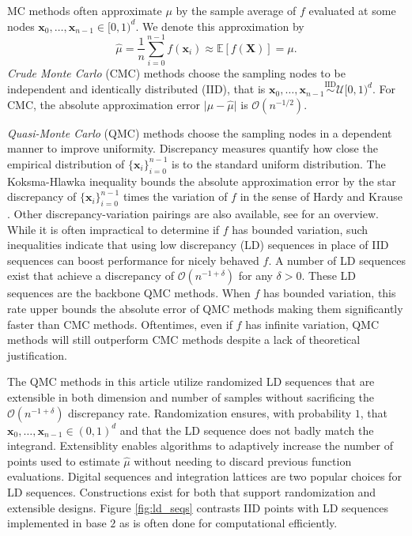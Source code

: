 \documentclass[graybox]{svmult}
\begin{document}
MC methods often approximate $\mu$ by the sample average of $f$ evaluated at some nodes $\boldsymbol{x}_0,\dots,\boldsymbol{x}_{n-1} \in [0,1)^d$. We denote this approximation by  
\begin{equation}
    \label{eq:mcapprox}
    \hat{\mu} = \frac{1}{n}\sum_{i=0}^{n-1} f(\boldsymbol{x}_i) \approx \mathbb{E}[f(\boldsymbol{X})] = \mu. 
\end{equation}
\emph{Crude Monte Carlo} (CMC) methods choose the sampling nodes to be independent and identically distributed (IID), that is $\boldsymbol{x}_0,\dots,\boldsymbol{x}_{n-1} \overset{\text{IID}}{\sim} \mathcal{U}[0,1)^{d}$. For CMC, the absolute approximation error $\lvert \mu - \hat{\mu} \rvert$ is $\mathcal{O}(n^{-1/2})$. 

\emph{Quasi-Monte Carlo} (QMC) methods choose the sampling nodes in a dependent manner to improve uniformity. Discrepancy measures quantify how close the empirical distribution of $\{\boldsymbol{x}_i\}_{i=0}^{n-1}$ is to the standard uniform distribution. The Koksma-Hlawka inequality bounds the absolute approximation error by the star discrepancy of $\{\boldsymbol{x}_i\}_{i=0}^{n-1}$ times the variation of $f$ in the sense of Hardy and Krause \cite{dick2013high}. Other discrepancy-variation pairings are also available, see \cite{hickernell1998generalized} for an overview. While it is often impractical to determine if $f$ has bounded variation, such inequalities indicate that using low discrepancy (LD) sequences in place of IID sequences can boost performance for nicely behaved $f$. A number of LD sequences exist that achieve a discrepancy of $\mathcal{O}(n^{-1+\delta})$ for any $\delta > 0$. These LD sequences are the backbone QMC methods. When $f$ has bounded variation, this rate upper bounds the absolute error of QMC methods making them significantly faster than CMC methods. Oftentimes, even if $f$ has infinite variation, QMC methods will still outperform CMC methods despite a lack of theoretical justification. 


The QMC methods in this article utilize randomized LD sequences that are extensible in both dimension and number of samples without sacrificing the $\mathcal{O}(n^{-1+\delta})$ discrepancy rate. Randomization ensures, with probability $1$, that $\boldsymbol{x}_0,\dots,\boldsymbol{x}_{n-1} \in (0,1)^d$ and that the LD sequence does not badly match the integrand. Extensiblity enables algorithms to adaptively increase the number of points used to estimate $\hat{\mu}$ without needing to discard previous function evaluations. Digital sequences and integration lattices are two popular choices for LD sequences. Constructions exist for both that support randomization and extensible designs. Figure \ref{fig:ld_seqs} contrasts IID points with LD sequences implemented in base $2$ as is often done for computational efficiently.
\end{document}
